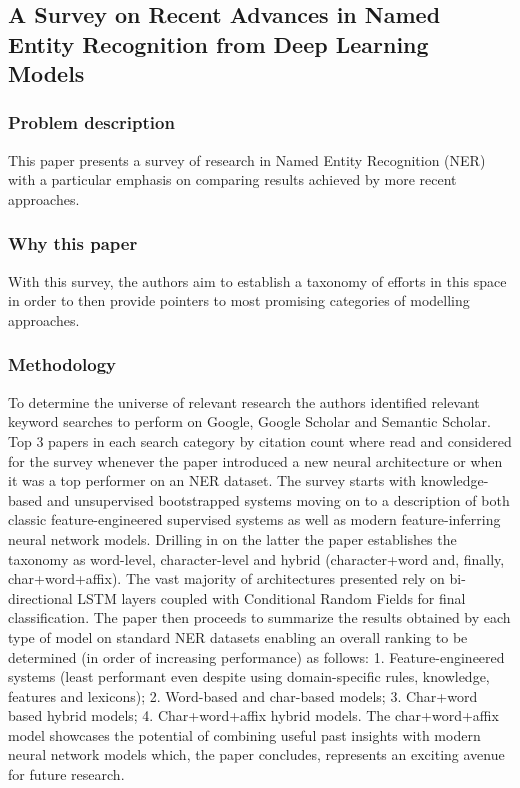 \documentclass[11pt]{article}
\begin{document}
\subsection{A Survey on Recent Advances in Named Entity Recognition from Deep Learning Models
\citet{yadav-bethard-2018-survey} }
\subsubsection{Problem description}
This paper presents a survey of research in Named Entity Recognition (NER) with a particular emphasis on comparing results achieved by more recent approaches. 
\subsubsection{Why this paper}
With this survey, the authors aim to establish a taxonomy of efforts in this space in order to then provide pointers to most promising categories of modelling approaches.
\subsubsection{Methodology}
To determine the universe of relevant research the authors identified relevant keyword searches to perform on Google, Google Scholar and Semantic Scholar. Top 3 papers in each search category by citation count where read and considered for the survey whenever the paper introduced a new neural architecture or when it was a top performer on an NER dataset. The survey starts with knowledge-based and unsupervised bootstrapped systems moving on to a description of both classic feature-engineered supervised systems as well as modern feature-inferring neural network models. Drilling in on the latter the paper establishes the taxonomy as word-level, character-level and hybrid (character+word and, finally, char+word+affix). The vast majority of architectures presented rely on bi-directional LSTM layers coupled with Conditional Random Fields for final classification. The paper then proceeds to summarize the results obtained by each type of model on standard NER datasets enabling an overall ranking to be determined (in order of increasing performance) as follows: 1. Feature-engineered systems (least performant even despite using domain-specific rules, knowledge, features and lexicons); 2. Word-based and char-based models; 3. Char+word based hybrid models; 4. Char+word+affix hybrid models. The char+word+affix model showcases the potential of combining useful past insights with modern neural network models which, the paper concludes, represents an exciting avenue for future research.
\end{document}
